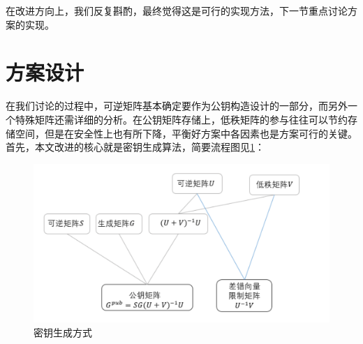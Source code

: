 在改进方向上，我们反复斟酌，最终觉得这是可行的实现方法，下一节重点讨论方案的实现。

\section{方案设计}
在我们讨论的过程中，可逆矩阵基本确定要作为公钥构造设计的一部分，而另外一个特殊矩阵还需详细的分析。在公钥矩阵存储上，低秩矩阵的参与往往可以节约存储空间，但是在安全性上也有所下降，平衡好方案中各因素也是方案可行的关键。首先，本文改进的核心就是密钥生成算法，简要流程图见\ref{fig:keygenmethod_pdf}：

\begin{figure}[H]
	\centering
	\includegraphics[width=15 cm]{fig/keygenmethod.pdf}
	\caption{密钥生成方式} %
	\label{fig:keygenmethod_pdf}
\end{figure}

